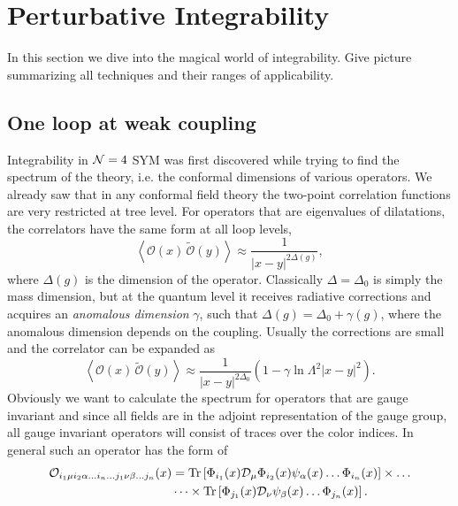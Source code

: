 
\section{Perturbative Integrability}

In this section we dive into the magical world of integrability.
Give picture summarizing all techniques and their ranges of applicability.

\subsection{One loop at weak coupling}



Integrability in $\mathcal{N}=4$ SYM was first discovered while trying to find the spectrum of the theory, i.e. the conformal dimensions of various operators. We already saw that in any conformal field theory the two-point correlation functions are very restricted at tree level. For operators that are eigenvalues of dilatations, the correlators have the same form at all loop levels,
\begin{equation}
	\left< \mathcal{O}(x) \, \tilde{\mathcal{O}}(y) \right> \approx \frac{1}{|x-y|^{2\Delta(g)}},
\end{equation}
where $\Delta(g)$ is the dimension of the operator. Classically $\Delta = \Delta_0$ is simply the mass dimension, but at the quantum level it receives radiative corrections and acquires an \emph{anomalous dimension} $\gamma$, such that $\Delta(g) = \Delta_0 + \gamma(g)$, where the anomalous dimension depends on the coupling. Usually the corrections are small and the correlator can be expanded as
\begin{equation}
	\left< \mathcal{O}(x) \, \tilde{\mathcal{O}}(y) \right> \approx \frac{1}{|x-y|^{2\Delta_0}} \left(1 - \gamma \ln \Lambda^2|x-y|^2 \right).
	\label{eq:anomdim_expansion}
\end{equation}
Obviously we want to calculate the spectrum for operators that are gauge invariant and since all fields are in the adjoint representation of the gauge group, all gauge invariant operators will consist of traces over the color indices. In general such an operator has the form of
\begin{eqnarray}
	\mathcal{O}_{i_1 \mu i_2 \alpha \dots i_n \dots j_1 \nu \beta \dots j_n}(x) & = \mathrm{Tr} \left[ \Phi_{i_1}(x) \mathcal{D}_\mu \Phi_{i_2}(x) \psi_\alpha(x) \dots \Phi_{i_n}(x) \right] \times \dots \nonumber \\
	& \dots \times \mathrm{Tr} \left[ \Phi_{j_1}(x) \mathcal{D}_\nu \psi_\beta(x) \dots \Phi_{j_n}(x) \right]. 
\end{eqnarray} 

